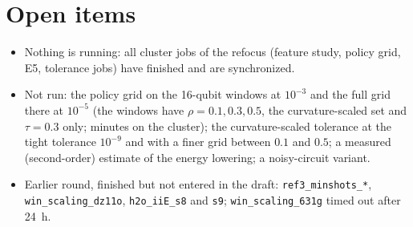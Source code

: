 \documentclass[11pt]{article}
\begin{document}
\section{Open items}\label{sec:open}
\begin{itemize}
  \item Nothing is running: all cluster jobs of the refocus (feature study, policy grid, E5, tolerance jobs) have finished and are synchronized.
  \item Not run: the policy grid on the 16-qubit windows at $10^{-3}$ and the full grid there at $10^{-5}$ (the windows have $\rho=0.1,0.3,0.5$, the curvature-scaled set and $\tau=0.3$ only; minutes on the cluster); the curvature-scaled tolerance at the tight tolerance $10^{-9}$ and with a finer grid between $0.1$ and $0.5$; a measured (second-order) estimate of the energy lowering; a noisy-circuit variant.
  \item Earlier round, finished but not entered in the draft: \texttt{ref3\_minshots\_*}, \texttt{win\_scaling\_dz11o}, \texttt{h2o\_iiE\_s8} and \texttt{s9}; \texttt{win\_scaling\_631g} timed out after 24~h.
\end{itemize}

\appendix
\end{document}
